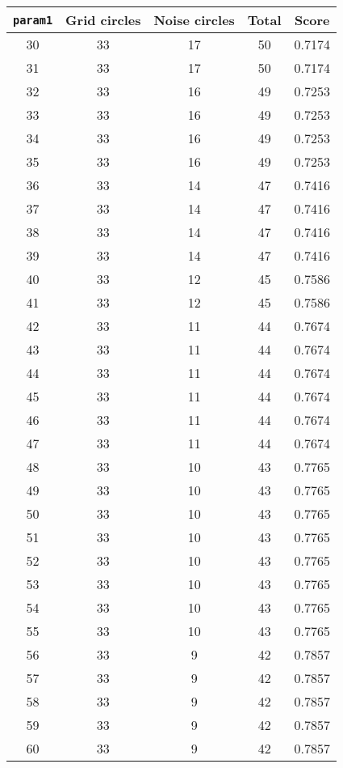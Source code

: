 \documentclass[letterpaper, 12pt]{article}
\begin{document}
\begin{longtable}{|c|c|c|c|c|}
\hline
\textbf{\texttt{param1}} & \textbf{Grid circles} & \textbf{Noise circles} & \textbf{Total} & \textbf{Score} \\
\hline
30 & 33 & 17 & 50 & 0.7174 \\
\hline
31 & 33 & 17 & 50 & 0.7174 \\
\hline
32 & 33 & 16 & 49 & 0.7253 \\
\hline
33 & 33 & 16 & 49 & 0.7253 \\
\hline
34 & 33 & 16 & 49 & 0.7253 \\
\hline
35 & 33 & 16 & 49 & 0.7253 \\
\hline
36 & 33 & 14 & 47 & 0.7416 \\
\hline
37 & 33 & 14 & 47 & 0.7416 \\
\hline
38 & 33 & 14 & 47 & 0.7416 \\
\hline
39 & 33 & 14 & 47 & 0.7416 \\
\hline
40 & 33 & 12 & 45 & 0.7586 \\
\hline
41 & 33 & 12 & 45 & 0.7586 \\
\hline
42 & 33 & 11 & 44 & 0.7674 \\
\hline
43 & 33 & 11 & 44 & 0.7674 \\
\hline
44 & 33 & 11 & 44 & 0.7674 \\
\hline
45 & 33 & 11 & 44 & 0.7674 \\
\hline
46 & 33 & 11 & 44 & 0.7674 \\
\hline
47 & 33 & 11 & 44 & 0.7674 \\
\hline
48 & 33 & 10 & 43 & 0.7765 \\
\hline
49 & 33 & 10 & 43 & 0.7765 \\
\hline
50 & 33 & 10 & 43 & 0.7765 \\
\hline
51 & 33 & 10 & 43 & 0.7765 \\
\hline
52 & 33 & 10 & 43 & 0.7765 \\
\hline
53 & 33 & 10 & 43 & 0.7765 \\
\hline
54 & 33 & 10 & 43 & 0.7765 \\
\hline
55 & 33 & 10 & 43 & 0.7765 \\
\hline
56 & 33 & 9 & 42 & 0.7857 \\
\hline
57 & 33 & 9 & 42 & 0.7857 \\
\hline
58 & 33 & 9 & 42 & 0.7857 \\
\hline
59 & 33 & 9 & 42 & 0.7857 \\
\hline
60 & 33 & 9 & 42 & 0.7857 \\

\end{longtable}
\end{document}
